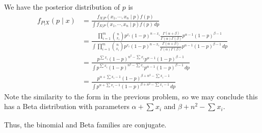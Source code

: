 \documentclass{article}
\begin{document}
\begin{enumerate}
\begin{enumerate}[(a)]
\begin{soln}
					We have the posterior distribution of $p$ is
					\begin{align*}
						f_{P|X}(p\mid x) &= \frac{f_{X|P}(x_1, \cdots, x_n\mid p) f(p)}{\int f_{X|P} (x_1, \cdots, x_n\mid p)f(p)\, dp} \\
						&= \frac{\displaystyle\prod_{i=1}^{m}\binom{n}{x_i} p^{x_i}(1-p)^{n-x_i} \frac{\Gamma(\alpha+\beta)}{\Gamma(\alpha)\Gamma(\beta)}p^{\alpha-1}(1-p)^{\beta-1}}{\displaystyle\int\prod_{i=1}^{m}\binom{n}{x_i} p^{x_i}(1-p)^{n-x_i} \frac{\Gamma(\alpha+\beta)}{\Gamma(\alpha)\Gamma(\beta)}p^{\alpha-1}(1-p)^{\beta-1}\, dp } \\
						&= \frac{p^{\sum_{}^{}x_i} (1-p)^{n^2-\sum_{}^{}x_i} p^{\alpha-1}(1-p)^{\beta-1}}{\displaystyle\int p^{\sum_{}^{}x_i} (1-p)^{n^2-\sum_{}^{}x_i} p^{\alpha-1}(1-p)^{\beta-1}\, dp} \\
						&= \frac{p^{\alpha+\sum_{}^{}x_i-1} (1-p)^{\beta+n^2-\sum_{}^{}x_i-1}}{\displaystyle\int p^{\alpha+\sum_{}^{}x_i-1} (1-p)^{\beta+n^2-\sum_{}^{}x_i-1} \, dp}
					\end{align*}
					Note the similarity to the form in the previous problem, so we may conclude this has a Beta distribution with parameters $\alpha+\sum_{}^{}x_i$ and $\beta+n^2-\sum_{}^{}x_i.$ 

					Thus, the binomial and Beta families are conjugate.
					
				\end{soln}


\end{enumerate}
\end{enumerate}
\end{document}
